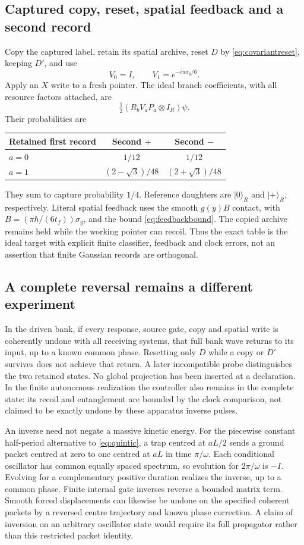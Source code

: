 \documentclass[11pt]{article}
\theoremstyle{definition}\newtheorem{assumption}[theorem]{Constitutive assumption}
\theoremstyle{remark}\newtheorem{remark}[theorem]{Remark}
\newcommand{\ket}[1]{|#1\rangle}\newcommand{\bra}[1]{\langle#1|}
\begin{document}
\subsection{Captured copy, reset, spatial feedback and a second record}
Copy the captured label, retain its spatial archive, reset $D$ by \eqref{eq:covariantreset}, keeping $D'$, and use
\[
 V_0=I,\qquad V_1=e^{-i\pi\sigma_y/6}.
\]
Apply an $X$ write to a fresh pointer. The ideal branch coefficients, with all resource factors attached, are
\[
 \tfrac12(R_bV_aP_a\otimes I_R)\psi.
\]
Their probabilities are
\begin{center}
\begin{tabular}{@{}lcc@{}}\toprule
Retained first record & Second $+$ & Second $-$\\\midrule
$a=0$ & $1/12$ & $1/12$\\
$a=1$ & $(2-\sqrt3)/48$ & $(2+\sqrt3)/48$\\\bottomrule
\end{tabular}
\end{center}
They sum to capture probability $1/4$. Reference daughters are $\ket0_R$ and $\ket+_R$, respectively. Literal spatial feedback uses the smooth $g(y)B$ contact, with $B=(\pi\hbar/(6t_f))\sigma_y$, and the bound \eqref{eq:feedbackbound}. The copied archive remains held while the working pointer can recoil. Thus the exact table is the ideal target with explicit finite classifier, feedback and clock errors, not an assertion that finite Gaussian records are orthogonal.

\subsection{A complete reversal remains a different experiment}
In the driven bank, if every response, source gate, copy and spatial write is coherently undone with all receiving systems, that full bank wave returns to its input, up to a known common phase. Resetting only $D$ while a copy or $D'$ survives does not achieve that return. A later incompatible probe distinguishes the two retained states. No global projection has been inserted at a declaration. In the finite autonomous realization the controller also remains in the complete state: its recoil and entanglement are bounded by the clock comparison, not claimed to be exactly undone by these apparatus inverse pulses.

An inverse need not negate a massive kinetic energy. For the piecewise constant half-period alternative to \eqref{eq:quintic}, a trap centred at $aL/2$ sends a ground packet centred at zero to one centred at $aL$ in time $\pi/\omega$. Each conditional oscillator has common equally spaced spectrum, so evolution for $2\pi/\omega$ is $-I$. Evolving for a complementary positive duration realizes the inverse, up to a common phase. Finite internal gate inverses reverse a bounded matrix term. Smooth forced displacements can likewise be undone on the specified coherent packets by a reversed centre trajectory and known phase correction. A claim of inversion on an arbitrary oscillator state would require its full propagator rather than this restricted packet identity.
\end{document}
